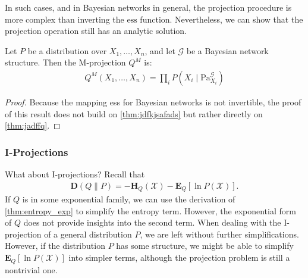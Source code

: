 \documentclass{article}
\begin{document}
In such cases, and in Bayesian networks in general, the projection procedure is more complex than inverting the $\mathrm{ess}$ function. Nevertheless, we can show that the projection operation still has an analytic solution.
\begin{thma}
Let $P$ be a distribution over $X_{1}, \ldots, X_{n}$, and let $\mathcal{G}$ be a Bayesian network structure. Then the M-projection $Q^{M}$ is:
\begin{align*}
Q^{M}\left(X_{1}, \ldots, X_{n}\right)=\prod_{i} P\left(X_{i} \mid \mathrm{Pa}_{X_{i}}^{\mathcal{G}}\right)
\end{align*}
\end{thma}
\begin{proof}
Because the mapping ess for Bayesian networks is not invertible, the proof of this result does not build on \cref{thm:jdfkjsafads} but rather directly on \cref{thm:jadffq}.
\end{proof}
\subsubsection{I-Projections}
What about I-projections? Recall that
\begin{align*}
\boldsymbol{D}(Q \| P)=-\boldsymbol{H}_{Q}(\mathcal{X})-\boldsymbol{E}_{Q}[\ln P(\mathcal{X})] .
\end{align*}
If $Q$ is in some exponential family, we can use the derivation of \cref{thm:entropy_exp} to simplify the entropy term. However, the exponential form of $Q$ does not provide insights into the second term. When dealing with the I-projection of a general distribution $P$, we are left without further simplifications. However, if the distribution $P$ has some structure, we might be able to simplify $\boldsymbol{E}_{Q}[\ln P(\mathcal{X})]$ into simpler terms, although the projection problem is still a nontrivial one.


\end{document}
